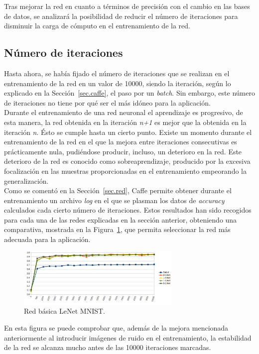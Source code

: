 Tras mejorar la red en cuanto a términos de precisión con el cambio en las bases de datos, se analizará la posibilidad de reducir el número de iteraciones para disminuir la carga de cómputo en el entrenamiento de la red.\\

\subsection{Número de iteraciones}
Hasta ahora, se había fijado el número de iteraciones que se realizan en el entrenamiento de la red en un valor de 10000, siendo la iteración, según lo explicado en la Sección~\ref{sec.caffe}, el paso por un \textit{batch}. Sin embargo, este número de iteraciones no tiene por qué ser el más idóneo para la aplicación.\\

Durante el entrenamiento de una red neuronal el aprendizaje es progresivo, de esta manera, la red obtenida en la iteración \textit{n+1} es mejor que la obtenida en la iteración \textit{n}. Ésto se cumple hasta un cierto punto. Existe un momento durante el entrenamiento de la red en el que la mejora entre iteraciones consecutivas es prácticamente nula, pudiéndose producir, incluso, un deterioro en la red. Este deterioro de la red es conocido como sobreaprendizaje, producido por la excesiva focalización en las muestras proporcionadas en el entrenamiento empeorando la generalización.\\

Como se comentó en la Sección~\ref{sec.red}, Caffe permite obtener durante el entrenamiento un archivo \textit{log} en el que se plasman los datos de \textit{accuracy} calculados cada cierto número de iteraciones. Estos resultados han sido recogidos para cada una de las redes explicadas en la sección anterior, obteniendo una comparativa, mostrada en la Figura~\ref{fig.iteraciones}, que permita seleccionar la red más adecuada para la aplicación.
\begin{figure}[H]
	\begin{center}
		\includegraphics[width=0.7\textwidth]{figures/iteraciones}
		\caption{Red básica LeNet MNIST.}
		\label{fig.iteraciones}
	\end{center}
\end{figure}
En esta figura se puede comprobar que, además de la mejora mencionada anteriormente al introducir imágenes de ruido en el entrenamiento, la estabilidad de la red se alcanza mucho antes de las 10000 iteraciones marcadas.\\

